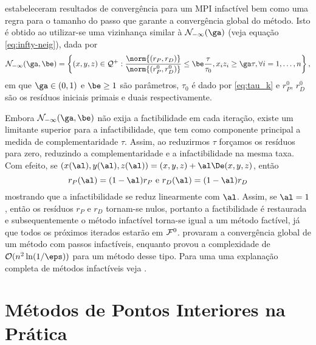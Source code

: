 \textcite{Kojima:1993fe}
estabeleceram resultados de convergência para um \ac{MPI} infactível bem como uma regra para o
tamanho do passo que garante a convergência global do método. Isto é obtido ao
utilizar-se uma vizinhança similar à $\Nset_{-\infty}(\ga)$ (veja equação \eqref{eq:infty-neig}), dada por 
\begin{equation}
\label{eq:infeasible-infty-neig}
\Nset_{-\infty}(\ga,\be) = \left\{(x,y,z) \in\Qset^+ :\frac{\norm{(r_P,r_D)}}{\norm{(r^0_P,r^0_D)}} \leq
\be\frac{\tau}{\tau_0}, 
x_iz_i\geq \ga\tau,\forall i =1,\dotsc,n \right\}, 
\end{equation}
em que $\ga \in(0,1)$ e $\be\geq 1$ são
parâmetros, $\tau_0$ é dado por \eqref{eq:tau_k} e  $r^0_P$, $r^0_D$ são os
resíduos iniciais primais e duais respectivamente.

 
Embora $\Nset_{-\infty}(\ga,\be)$ não exija a factibilidade em cada iteração,
 existe um limitante superior para a infactibilidade,  que tem como
componente principal a medida de  complementaridade $\tau$.
Assim, ao reduzirmos $\tau$ forçamos os resíduos para zero,  reduzindo
a complementaridade e a infactibilidade na mesma taxa. Com efeito, se
$(x(\al),y(\al),z(\al)) = (x,y,z) + \al\De(x,y,z)$, então 
\[
r_P(\al) = (1-\al)r_P \text{ e } 
r_D(\al) = (1-\al)r_D
\]
mostrando que a infactibilidade se reduz linearmente com $\al$.  Assim, se $\al
= 1$, então os resíduos $r_P$ e $r_D$ tornam-se nulos, portanto a factibilidade é
restaurada e  subsequentemente o método infactível torna-se igual a um método
factível, já que todos os próximos iterados estarão em $\mathcal{F}^0$.
\textcite{Kojima:1993fe} provaram a convergência global de um método com passos
infactíveis, enquanto \textcite{Zhang:2006ic} provou  a complexidade  de $\Oset(
n^2 \ln ( 1/\eps ) )$ para um método desse tipo. Para uma uma explanação
completa de métodos infactíveis veja \textcite[cap. 6]{Wright:Primal-dual-interior-point:1997h}. 



 
 

 


\section{Métodos de Pontos Interiores na Prática}

